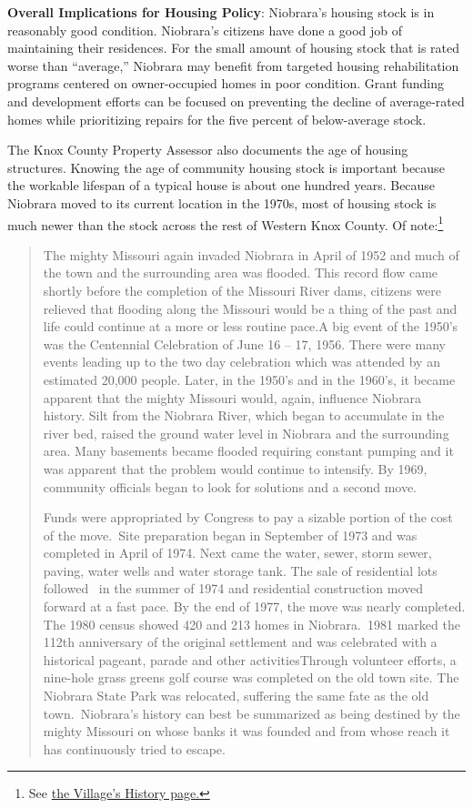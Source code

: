 \documentclass[
  letterpaper,
  DIV=11,
  numbers=noendperiod]{scrartcl}
\begin{document}
\textbf{Overall Implications for Housing Policy}: Niobrara's housing
stock is in reasonably good condition. Niobrara's citizens have done a
good job of maintaining their residences. For the small amount of
housing stock that is rated worse than ``average,'' Niobrara may benefit
from targeted housing rehabilitation programs centered on owner-occupied
homes in poor condition. Grant funding and development efforts can be
focused on preventing the decline of average-rated homes while
prioritizing repairs for the five percent of below-average stock.

The Knox County Property Assessor also documents the age of housing
structures. Knowing the age of community housing stock is important
because the workable lifespan of a typical house is about one hundred
years. Because Niobrara moved to its current location in the 1970s, most
of housing stock is much newer than the stock across the rest of Western
Knox County. Of note:\footnote{See
  \href{https://niobrarane.com/history/}{the Village's History page.}}

\begin{quote}
The mighty Missouri again invaded Niobrara in April of 1952 and much of
the town and the surrounding area was flooded. This record flow came
shortly before the completion of the Missouri River dams, citizens were
relieved that flooding along the Missouri would be a thing of the past
and life could continue at a more or less routine pace.A big event of
the 1950's was the Centennial Celebration of June 16 -- 17, 1956. There
were many events leading up to the two day celebration which was
attended by an estimated 20,000 people. Later, in the 1950's and in the
1960's, it became apparent that the mighty Missouri would, again,
influence Niobrara history. Silt from the Niobrara River, which began to
accumulate in the river bed, raised the ground water level in Niobrara
and the surrounding area. Many basements became flooded requiring
constant pumping and it was apparent that the problem would continue to
intensify. By 1969, community officials began to look for solutions and
a second move.

Funds were appropriated by Congress to pay a sizable portion of the cost
of the move.~Site preparation began in September of 1973 and was
completed in April of 1974. Next came the water, sewer, storm sewer,
paving, water wells and water storage tank. The sale of residential lots
followed~ in the summer of 1974 and residential construction moved
forward at a fast pace. By the end of 1977, the move was nearly
completed. The 1980 census showed 420 and 213 homes in Niobrara.~1981
marked the 112th anniversary of the original settlement and was
celebrated with a historical pageant, parade and other activitiesThrough
volunteer efforts, a nine-hole grass greens golf course was completed on
the old town site. The Niobrara State Park was relocated, suffering the
same fate as the old town.~Niobrara's history can best be summarized as
being destined by the mighty Missouri on whose banks it was founded and
from whose reach it has continuously tried to escape.
\end{quote}
\end{document}
